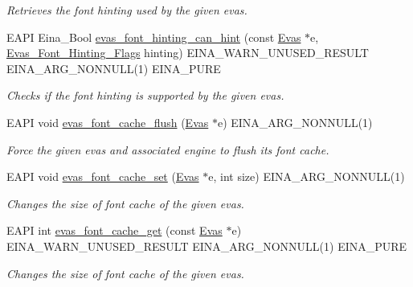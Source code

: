 \begin{DoxyCompactItemize}
\begin{DoxyCompactList}\small\item\em Retrieves the font hinting used by the given evas. \item\end{DoxyCompactList}\item 
EAPI Eina\_\-Bool \hyperlink{group__Evas__Font__Group_gaa4210fa6661330e67ec4c9cbde775b4b}{evas\_\-font\_\-hinting\_\-can\_\-hint} (const \hyperlink{group__Evas__Canvas_ga5ff87cc4ce6bc43e3b640a6d37f73043}{Evas} $\ast$e, \hyperlink{group__Evas__Font__Group_gaaed9273c1705a3d2356470c60b2f5aa5}{Evas\_\-Font\_\-Hinting\_\-Flags} hinting) EINA\_\-WARN\_\-UNUSED\_\-RESULT EINA\_\-ARG\_\-NONNULL(1) EINA\_\-PURE
\begin{DoxyCompactList}\small\item\em Checks if the font hinting is supported by the given evas. \item\end{DoxyCompactList}\item 
EAPI void \hyperlink{group__Evas__Font__Group_gad75ac8ed0c921e774f1c519a66f05a2f}{evas\_\-font\_\-cache\_\-flush} (\hyperlink{group__Evas__Canvas_ga5ff87cc4ce6bc43e3b640a6d37f73043}{Evas} $\ast$e) EINA\_\-ARG\_\-NONNULL(1)
\begin{DoxyCompactList}\small\item\em Force the given evas and associated engine to flush its font cache. \item\end{DoxyCompactList}\item 
EAPI void \hyperlink{group__Evas__Font__Group_ga5582cfcdb08f6253225bb8cede49033a}{evas\_\-font\_\-cache\_\-set} (\hyperlink{group__Evas__Canvas_ga5ff87cc4ce6bc43e3b640a6d37f73043}{Evas} $\ast$e, int size) EINA\_\-ARG\_\-NONNULL(1)
\begin{DoxyCompactList}\small\item\em Changes the size of font cache of the given evas. \item\end{DoxyCompactList}\item 
EAPI int \hyperlink{group__Evas__Font__Group_ga9cf39aae3074cac05c4aafa3ff24c32f}{evas\_\-font\_\-cache\_\-get} (const \hyperlink{group__Evas__Canvas_ga5ff87cc4ce6bc43e3b640a6d37f73043}{Evas} $\ast$e) EINA\_\-WARN\_\-UNUSED\_\-RESULT EINA\_\-ARG\_\-NONNULL(1) EINA\_\-PURE
\begin{DoxyCompactList}\small\item\em Changes the size of font cache of the given evas. \item\end{DoxyCompactList}\item 

\end{DoxyCompactItemize}
